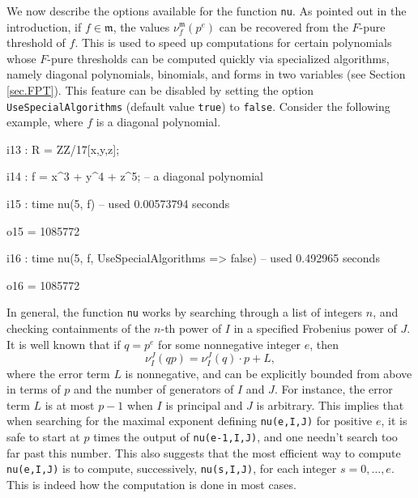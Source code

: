 \documentclass{amsart}
\begin{document}
We now describe the options available for the function \texttt{nu}.
As pointed out in the introduction, if $f \in \mathfrak{m}$, the values $\nu^{\mathfrak{m}}_f(p^e)$ can be recovered from the $F$-pure threshold of $f$.
This is used to speed up computations for certain polynomials whose $F$-pure thresholds can be computed quickly via specialized algorithms, namely diagonal polynomials, binomials, and forms in two variables (see Section \ref{sec.FPT}).  This feature can be disabled by setting the option \texttt{UseSpecialAlgorithms} (default value \texttt{true}) to \texttt{false}.  Consider the following example, where $f$ is a diagonal polynomial.
\bigskip
{\small
{}
\begin{MyVerbatim}
i13 : R = ZZ/17[x,y,z];

i14 : f = x^3 + y^4 + z^5; -- a diagonal polynomial

i15 : time nu(5, f)
     -- used 0.00573794 seconds

o15 = 1085772

i16 : time nu(5, f, UseSpecialAlgorithms => false)
     -- used 0.492965 seconds

o16 = 1085772
\end{MyVerbatim}
}
\bigskip





In general, the function \texttt{nu} works by searching through a list of integers $n$, and checking containments of the $n$-th power of $I$ in a specified Frobenius power of $J$.
It is well known that if $q=p^e$ for some nonnegative integer $e$, then \[ \nu_I^J(qp) = \nu_I^J(q)\cdot p + L,\]  where the error term $L$ is nonnegative, and can be explicitly bounded from above in terms of $p$ and the number of generators of $I$ and $J$.  For instance, the error term $L$ is at most $p-1$ when $I$ is principal and $J$ is arbitrary.
This implies that when searching for the maximal exponent defining \texttt{nu(e,I,J)} for positive $e$, it is safe to start at $p$ times the output of \texttt{nu(e-1,I,J)}, and one needn't search too far past this number.  This also suggests that the most efficient way to compute \texttt{nu(e,I,J)} is to compute, successively, \texttt{nu(s,I,J)}, for each integer $s = 0,\ldots,e$.  This is indeed how the computation is done in most cases.
\end{document}
